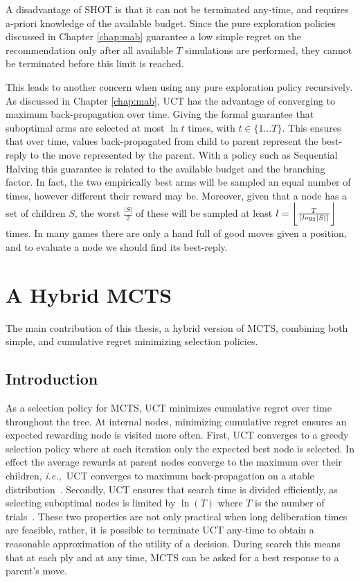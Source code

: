 \documentclass{kecsmstr}
\DeclarePairedDelimiter{\ceil}{\lceil}{\rceil}
\DeclarePairedDelimiter{\floor}{\lfloor}{\rfloor}
\newcommand{\ie}{{\it i.e.,}~}
\begin{document}
A disadvantage of SHOT is that it can not be terminated any-time, and requires a-priori knowledge of the available budget. Since the pure exploration policies discussed in Chapter \ref{chap:mab} guarantee a low simple regret on the recommendation only after all available $T$ simulations are performed, they cannot be terminated before this limit is reached.

 This leads to another concern when using any pure exploration policy recursively. As discussed in Chapter \ref{chap:mab}, UCT has the advantage of converging to maximum back-propagation over time. Giving the formal guarantee that suboptimal arms are selected at most $\ln{t}$ times, with $t\in \{1\dots T\}$. This ensures that over time, values back-propagated from child to parent represent the best-reply to the move represented by the parent. With a policy such as Sequential Halving this guarantee is related to the available budget and the branching factor. In fact, the two empirically best arms will be sampled an equal number of times, however different their reward may be. Moreover, given that a node has a set of children $S$, the worst $\frac{|S|}{2}$ of these will be sampled at least $l = \floor[\bigg]{\frac{T}{\ceil{log_2{|S|}}}}$ times. In many games there are only a hand full of good moves given a position, and to evaluate a node we should find its best-reply.

\chapter{A Hybrid MCTS}
\label{chap:hybmcts}
\begin{chaptercontents}
The main contribution of this thesis, a hybrid version of MCTS, combining both simple, and cumulative regret minimizing selection policies.
\end{chaptercontents}
\section{Introduction}
As a selection policy for MCTS, UCT minimizes cumulative regret over time throughout the tree. At internal nodes, minimizing cumulative regret ensures an expected rewarding node is visited more often. First, UCT converges to a greedy selection policy where at each iteration only the expected best node is selected. In effect the average rewards at parent nodes converge to the maximum over their children, \ie UCT converges to maximum back-propagation on a stable distribution~. Secondly, UCT ensures that search time is divided efficiently, as selecting suboptimal nodes is limited by $\ln(T)$ where $T$ is the number of trials~. These two properties are not only practical when long deliberation times are feasible, rather, it is possible to terminate UCT any-time to obtain a reasonable approximation of the utility of a decision. During search this means that at each ply and at any time, MCTS can be asked for a best response to a parent's move.
\end{document}
